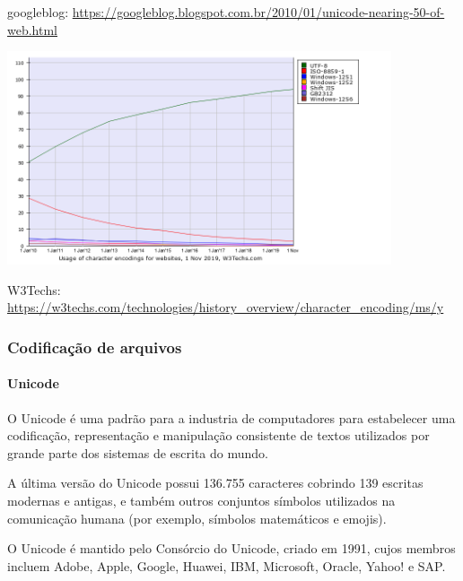 \begin{frame}[allowframebreaks]
	\footnotesize{googleblog: \url{https://googleblog.blogspot.com.br/2010/01/unicode-nearing-50-of-web.html}}

  \includegraphics[width=0.85\textwidth]{figures/w3usage.png}

	\footnotesize{W3Techs: \url{https://w3techs.com/technologies/history_overview/character_encoding/ms/y}}
\end{frame}


\begin{frame}
\frametitle{Codificação de arquivos}
\framesubtitle{Unicode}
  O Unicode é uma padrão para a industria de computadores para estabelecer uma 
  codificação, representação e manipulação consistente de textos utilizados por grande parte dos
  sistemas de escrita do mundo.

  A última versão do Unicode possui 136.755 caracteres cobrindo 139 escritas modernas e antigas, 
  e também outros conjuntos símbolos utilizados na comunicação humana (por exemplo, símbolos matemáticos
  e emojis).

  O Unicode é mantido pelo Consórcio do Unicode, criado em 1991, cujos membros incluem Adobe, Apple, Google, Huawei, IBM,
  Microsoft, Oracle, Yahoo! e SAP.
\end{frame}


